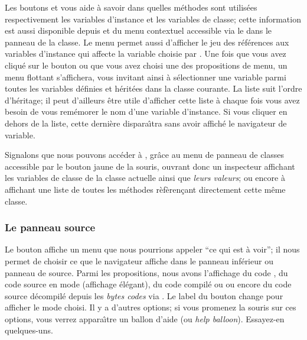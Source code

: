 \documentclass[a4paper,10pt,twoside]{book}
\begin{document}
Les boutons  et  vous aide \`a savoir
dans quelles m\'ethodes sont utilis\'ees respectivement les variables d'instance
et les variables de classe; cette information est aussi disponible depuis 
 et  du menu contextuel accessible via le 
 dans le panneau de la classe.
Le menu permet aussi d'afficher le jeu 
des r\'ef\'erences aux variables d'instance qui affecte la variable choisie
par .
Une fois que vous avez cliqu\'e sur le bouton ou que vous avez choisi une
des propositions de menu, un menu flottant s'affichera, vous invitant ainsi
\`a s\'electionner une variable parmi toutes les variables d\'efinies et
h\'erit\'ees dans la classe courante.
La liste suit l'ordre d'h\'eritage; il peut d'ailleurs \^etre utile d'afficher
cette liste \`a chaque fois vous avez besoin de vous rem\'emorer le nom d'une
variable d'instance. Si vous cliquer en dehors de la liste, cette derni\`ere
dispara\^{\i}tra sans avoir affich\'e le navigateur de variable.

Signalons que nous pouvons acc\'eder \`a ,
gr\^ace au menu de panneau de classes accessible par le bouton jaune
de la souris, 
ouvrant donc un inspecteur affichant les variables de classe 
de la classe actuelle ainsi que \emph{leurs valeurs};
ou encore \`a
 affichant une liste de toutes les m\'ethodes
r\`ef\`eren\c{c}ant directement cette m\^eme classe.

\subsubsection{Le panneau source}
\label{sec:sources}

Le bouton  affiche un menu que nous pourrions appeler
``ce qui est \`a voir''; il nous permet de choisir ce que le navigateur
affiche dans le panneau inf\'erieur ou panneau de source.
Parmi les propositions, nous avons l'affichage du code , 
du code source en mode  (affichage \'el\'egant), 
du code compil\'e ou  ou encore du code source
d\'ecompil\'e depuis les \emph{bytes codes} via .
Le label du bouton change pour afficher le mode choisi. Il y a d'autres
options; si vous promenez la souris sur ces options, vous verrez
appara\^{\i}tre un ballon d'aide (ou \emph{help balloon}). Essayez-en
quelques-uns. 
\end{document}
